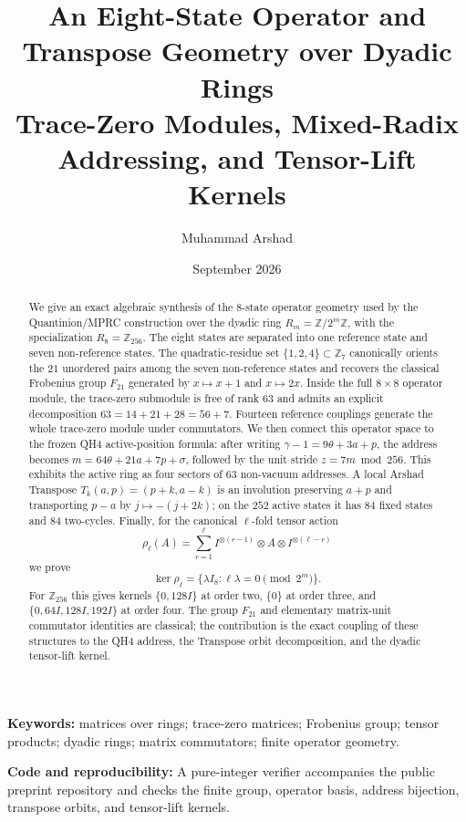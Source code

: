 \documentclass[11pt]{article}
\title{\textbf{An Eight-State Operator and Transpose Geometry over Dyadic Rings}\\
Trace-Zero Modules, Mixed-Radix Addressing, and Tensor-Lift Kernels}
\author{Muhammad Arshad}
\date{September 2026}
\theoremstyle{definition}
\newcommand{\Z}{\mathbb Z}
\begin{document}
\maketitle

\begin{abstract}
We give an exact algebraic synthesis of the 8-state operator geometry used by the Quantinion/MPRC construction over the dyadic ring $R_m=\Z/2^m\Z$, with the specialization $R_8=\Z_{256}$. The eight states are separated into one reference state and seven non-reference states. The quadratic-residue set $\{1,2,4\}\subset\Z_7$ canonically orients the $21$ unordered pairs among the seven non-reference states and recovers the classical Frobenius group $F_{21}$ generated by $x\mapsto x+1$ and $x\mapsto2x$. Inside the full $8\times8$ operator module, the trace-zero submodule is free of rank $63$ and admits an explicit decomposition $63=14+21+28=56+7$. Fourteen reference couplings generate the whole trace-zero module under commutators. We then connect this operator space to the frozen QH4 active-position formula: after writing $\gamma-1=9\theta+3a+p$, the address becomes $m=64\theta+21a+7p+\sigma$, followed by the unit stride $z=7m\bmod256$. This exhibits the active ring as four sectors of $63$ non-vacuum addresses. A local Arshad Transpose $T_k(a,p)=(p+k,a-k)$ is an involution preserving $a+p$ and transporting $p-a$ by $j\mapsto-(j+2k)$; on the $252$ active states it has $84$ fixed states and $84$ two-cycles. Finally, for the canonical $\ell$-fold tensor action
\[
\rho_\ell(A)=\sum_{r=1}^{\ell}I^{\otimes(r-1)}\otimes A\otimes I^{\otimes(\ell-r)}
\]
we prove
\[
\ker\rho_\ell=\{\lambda I_8:\ell\lambda=0\pmod{2^m}\}.
\]
For $\Z_{256}$ this gives kernels $\{0,128I\}$ at order two, $\{0\}$ at order three, and $\{0,64I,128I,192I\}$ at order four. The group $F_{21}$ and elementary matrix-unit commutator identities are classical; the contribution is the exact coupling of these structures to the QH4 address, the Transpose orbit decomposition, and the dyadic tensor-lift kernel.
\end{abstract}

\noindent\textbf{Keywords:} matrices over rings; trace-zero matrices; Frobenius group; tensor products; dyadic rings; matrix commutators; finite operator geometry.

\medskip
\noindent\textbf{Code and reproducibility:} A pure-integer verifier accompanies the public preprint repository and checks the finite group, operator basis, address bijection, transpose orbits, and tensor-lift kernels.
\end{document}
